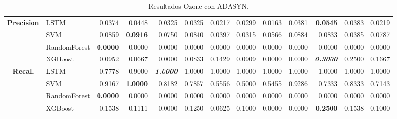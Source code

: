 \begin{table}[H]
\begin{adjustbox}{max width=14cm}
\begin{tabular}{|c|l|r|r|r|r|r|r|r|r|r|r|r|}
			\hline
			\textbf{Precision} &  LSTM &  0.0374 &  0.0448 &  0.0325 &  0.0325 &  0.0217 &  0.0299 &  0.0163 &  0.0381 & \textbf{  0.0545 } &  0.0383 &  0.0219 \\
			&  SVM &  0.0859 & \textbf{  0.0916 } &  0.0750 &  0.0840 &  0.0397 &  0.0315 &  0.0566 &  0.0884 &  0.0833 &  0.0385 &  0.0787 \\
			&  RandomForest & \textbf{  0.0000 } &  0.0000 &  0.0000 &  0.0000 &  0.0000 &  0.0000 &  0.0000 &  0.0000 &  0.0000 &  0.0000 &  0.0000 \\
			&  XGBoost &  0.0952 &  0.0667 &  0.0000 &  0.0833 &  0.1429 &  0.0909 &  0.0000 &  0.0000 & \textit{ \textbf{  0.3000 } } &  0.2500 &  0.1667 \\
			\hline
			\textbf{Recall} &  LSTM &  0.7778 &  0.9000 & \textit{ \textbf{  1.0000 } } &  1.0000 &  1.0000 &  1.0000 &  1.0000 &  1.0000 &  1.0000 &  1.0000 &  1.0000 \\
			&  SVM &  0.9167 & \textbf{  1.0000 } &  0.8182 &  0.7857 &  0.5556 &  0.5000 &  0.5455 &  0.9286 &  0.7333 &  0.8333 &  0.7143 \\
			&  RandomForest & \textbf{  0.0000 } &  0.0000 &  0.0000 &  0.0000 &  0.0000 &  0.0000 &  0.0000 &  0.0000 &  0.0000 &  0.0000 &  0.0000 \\
			&  XGBoost &  0.1538 &  0.1111 &  0.0000 &  0.1250 &  0.0625 &  0.1000 &  0.0000 &  0.0000 & \textbf{  0.2500 } &  0.1538 &  0.1000 \\
			\hline
		\end{tabular}
	\end{adjustbox}
	\caption{Resultados Ozone con ADASYN.}
	\label{tab:Ozone_ADASYN}
\end{table}

